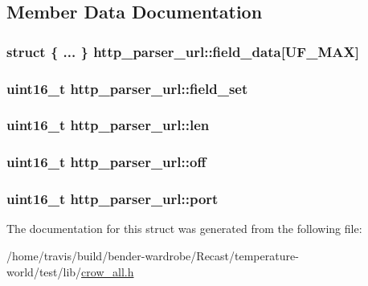 \subsection{Member Data Documentation}
\hypertarget{structhttp__parser__url_a96a1fed71f3471692e9832f91b42f7db}{
\subsubsection[{field\-\_\-data}]{\setlength{\rightskip}{0pt plus 5cm}struct \{ ... \}   http\-\_\-parser\-\_\-url\-::field\-\_\-data\mbox{[}{\bf U\-F\-\_\-\-M\-A\-X}\mbox{]}}}\label{structhttp__parser__url_a96a1fed71f3471692e9832f91b42f7db}
\hypertarget{structhttp__parser__url_a77af61a480f11c41938810dd76ca49eb}{
\subsubsection[{field\-\_\-set}]{\setlength{\rightskip}{0pt plus 5cm}uint16\-\_\-t http\-\_\-parser\-\_\-url\-::field\-\_\-set}}\label{structhttp__parser__url_a77af61a480f11c41938810dd76ca49eb}
\hypertarget{structhttp__parser__url_a60fb784a989dd5a95e5bd19d468d22c7}{
\subsubsection[{len}]{\setlength{\rightskip}{0pt plus 5cm}uint16\-\_\-t http\-\_\-parser\-\_\-url\-::len}}\label{structhttp__parser__url_a60fb784a989dd5a95e5bd19d468d22c7}
\hypertarget{structhttp__parser__url_a6510826f3aa9a1100ac5f714323edeb1}{
\subsubsection[{off}]{\setlength{\rightskip}{0pt plus 5cm}uint16\-\_\-t http\-\_\-parser\-\_\-url\-::off}}\label{structhttp__parser__url_a6510826f3aa9a1100ac5f714323edeb1}
\hypertarget{structhttp__parser__url_a875fb8faf3ee45707078eda5435fa563}{
\subsubsection[{port}]{\setlength{\rightskip}{0pt plus 5cm}uint16\-\_\-t http\-\_\-parser\-\_\-url\-::port}}\label{structhttp__parser__url_a875fb8faf3ee45707078eda5435fa563}


The documentation for this struct was generated from the following file\-:\begin{DoxyCompactItemize}
\item 
/home/travis/build/bender-\/wardrobe/\-Recast/temperature-\/world/test/lib/\hyperlink{crow__all_8h}{crow\-\_\-all.\-h}\end{DoxyCompactItemize}
